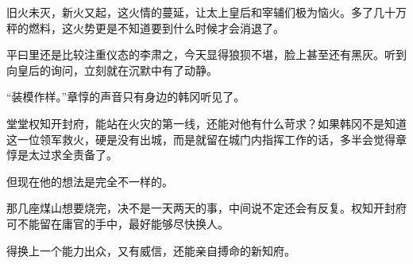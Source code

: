 旧火未灭，新火又起，这火情的蔓延，让太上皇后和宰辅们极为恼火。多了几十万秤的燃料，这火势更是不知道要到什么时候才会消退了。

平曰里还是比较注重仪态的李肃之，今天显得狼狈不堪，脸上甚至还有黑灰。听到向皇后的询问，立刻就在沉默中有了动静。

“装模作样。”章惇的声音只有身边的韩冈听见了。

堂堂权知开封府，能站在火灾的第一线，还能对他有什么苛求？如果韩冈不是知道这一位领军救火，硬是没有出城，而是就留在城门内指挥工作的话，多半会觉得章惇是太过求全责备了。

但现在他的想法是完全不一样的。

那几座煤山想要烧完，决不是一天两天的事，中间说不定还会有反复。权知开封府可不能留在庸官的手中，最好能够尽快换人。

得换上一个能力出众，又有威信，还能亲自搏命的新知府。
